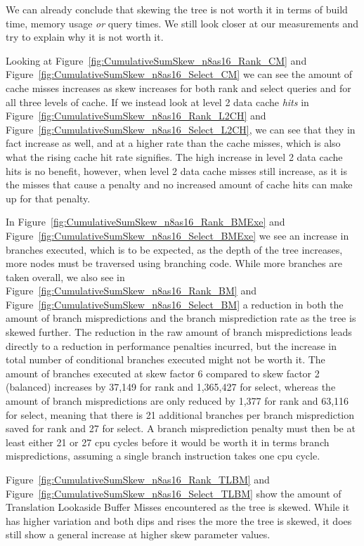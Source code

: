We can already conclude that skewing the tree is not worth it in terms of build time, memory usage \textit{or} query times.
We still look closer at our measurements and try to explain why it is not worth it.

Looking at Figure~\ref{fig:CumulativeSumSkew_n8as16_Rank_CM} and Figure~\ref{fig:CumulativeSumSkew_n8as16_Select_CM} we can see the amount of cache misses increases as skew increases for both rank and select queries and for all three levels of cache.
If we instead look at level 2 data cache \textit{hits} in Figure~\ref{fig:CumulativeSumSkew_n8as16_Rank_L2CH} and Figure~\ref{fig:CumulativeSumSkew_n8as16_Select_L2CH}, we can see that they in fact increase as well, and at a higher rate than the cache misses, which is also what the rising cache hit rate signifies.
The high increase in level 2 data cache hits is no benefit, however, when level 2 data cache misses still increase, as it is the misses that cause a penalty and no increased amount of cache hits can make up for that penalty.

In Figure~\ref{fig:CumulativeSumSkew_n8as16_Rank_BMExe} and Figure~\ref{fig:CumulativeSumSkew_n8as16_Select_BMExe} we see an increase in branches executed, which is to be expected, as the depth of the tree increases, more nodes must be traversed using branching code.
While more branches are taken overall, we also see in Figure~\ref{fig:CumulativeSumSkew_n8as16_Rank_BM} and Figure~\ref{fig:CumulativeSumSkew_n8as16_Select_BM} a reduction in both the amount of branch mispredictions and the branch misprediction rate as the tree is skewed further.
The reduction in the raw amount of branch mispredictions leads directly to a reduction in performance penalties incurred, but the increase in total number of conditional branches executed might not be worth it.
The amount of branches executed at skew factor 6 compared to skew factor 2 (balanced) increases by 37,149 for rank and 1,365,427 for select, whereas the amount of branch mispredictions are only reduced by 1,377 for rank and 63,116 for select, meaning that there is 21 additional branches per branch misprediction saved for rank and 27 for select.
A branch misprediction penalty must then be at least either 21 or 27 cpu cycles before it would be worth it in terms branch mispredictions, assuming a single branch instruction takes one cpu cycle.

Figure~\ref{fig:CumulativeSumSkew_n8as16_Rank_TLBM} and Figure~\ref{fig:CumulativeSumSkew_n8as16_Select_TLBM} show the amount of Translation Lookaside Buffer Misses encountered as the tree is skewed.
While it has higher variation and both dips and rises the more the tree is skewed, it does still show a general increase at higher skew parameter values.

